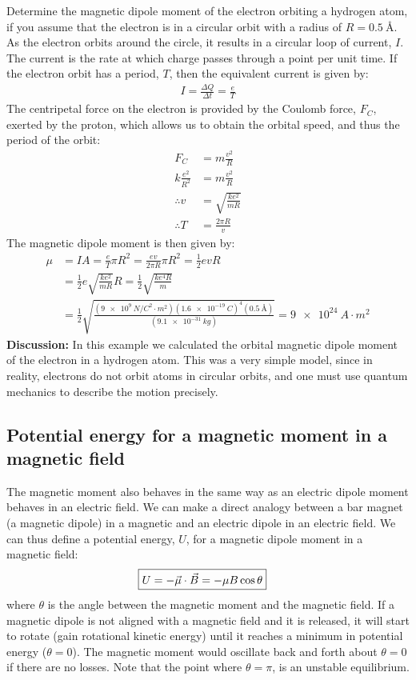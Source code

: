 \begin{example}{Determine the magnetic dipole moment of the electron orbiting a hydrogen atom, if you assume that the electron is in a circular orbit with a radius of $R=\SI{0.5}{\angstrom}$.}
As the electron orbits around the circle, it results in a circular loop of current, $I$. The current is the rate at which charge passes through a point per unit time. If the electron orbit has a period, $T$, then the equivalent current is given by:
\begin{align*}
I=\frac{\Delta Q}{\Delta t} = \frac{e}{T}
\end{align*}
The centripetal force on the electron is provided by the Coulomb force, $F_C$, exerted by the proton, which allows us to obtain the orbital speed, and thus the period of the orbit:
\begin{align*}
F_C &= m\frac{v^2}{R}\\
k\frac{e^2}{R^2}&= m\frac{v^2}{R}\\
\therefore v &=\sqrt{\frac{ke^2}{mR}}\\
\therefore T &= \frac{2\pi R}{v}
\end{align*}
The magnetic dipole moment is then given by:
\begin{align*}
\mu &= IA = \frac{e}{T} \pi R^2 = \frac{ev}{2\pi R} \pi R^2=\frac{1}{2} evR\\
&=\frac{1}{2} e\sqrt{\frac{ke^2}{mR}}R=\frac{1}{2} \sqrt{\frac{ke^4R}{m}}\\
&=\frac{1}{2} \sqrt{\frac{(\SI{9e9}{N/C^{2}\cdot m^2})(\SI{1.6e-19}{C})^4(\SI{0.5}{\angstrom})}{(\SI{9.1e-31}{kg})}}=\SI{9e24}{A\cdot m^2}
\end{align*}
\textbf{Discussion:} In this example we calculated the orbital magnetic dipole moment of the electron in a hydrogen atom. This was a very simple model, since in reality, electrons do not orbit atoms in circular orbits, and one must use quantum mechanics to describe the motion precisely. 
\end{example}

\subsection{Potential energy for a magnetic moment in a magnetic field}
The magnetic moment also behaves in the same way as an electric dipole moment behaves in an electric field. We can make a direct analogy between a bar magnet (a magnetic dipole) in a magnetic and an electric dipole in an electric field. We can thus define a potential energy, $U$, for a magnetic dipole moment in a magnetic field:
\begin{align*}
\Aboxed{U =-\vec \mu \cdot \vec B =- \mu B \cos\theta}
\end{align*}
where $\theta$ is the angle between the magnetic moment and the magnetic field. If a magnetic dipole is not aligned with a magnetic field and it is released, it will start to rotate (gain rotational kinetic energy) until it reaches a minimum in potential energy ($\theta = 0$). The magnetic moment would oscillate back and forth about $\theta =0$ if there are no losses. Note that the point where $\theta = \pi$, is an unstable equilibrium.

